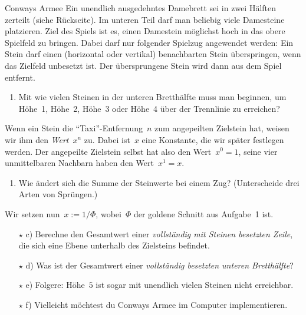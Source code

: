 \documentclass{zirkelblatt}
\begin{document}
\begin{aufgabe}{Conways Armee}
Ein unendlich ausgedehntes Damebrett sei in zwei Hälften zerteilt (siehe
Rückseite). Im unteren Teil darf man beliebig viele Damesteine platzieren. Ziel
des Spiels ist es, einen Damestein möglichst hoch in das obere Spielfeld zu
bringen. Dabei darf nur folgender Spielzug angewendet werden: Ein Stein
darf einen (horizontal oder vertikal) benachbarten Stein überspringen, wenn das
Zielfeld unbesetzt ist. Der übersprungene Stein wird dann aus dem Spiel
entfernt.
\begin{enumerate}
\item Mit wie vielen Steinen in der unteren Bretthälfte muss man beginnen, um
Höhe~1, Höhe~2, Höhe~3 oder Höhe~4 über der Trennlinie zu erreichen?
\end{enumerate}
Wenn ein Stein die
"`Taxi"'-Entfernung~$n$ zum angepeilten Zielstein hat, weisen wir ihm den \emph{Wert}~$x^n$ zu.
Dabei ist~$x$ eine Konstante, die wir später festlegen werden.
Der angepeilte Zielstein selbst hat also den Wert~$x^0 = 1$, seine vier
unmittelbaren Nachbarn haben den Wert~$x^1 = x$.
\begin{enumerate}
\addtocounter{enumi}{1}
\item Wie ändert sich die Summe der Steinwerte bei einem Zug? (Unterscheide drei Arten von Sprüngen.)
\end{enumerate}
Wir setzen nun~$x := 1/\Phi$, wobei~$\Phi$ der goldene Schnitt aus Aufgabe~1
ist.
\begin{enumerate}
\item[$\star$ c)] Berechne den Gesamtwert einer \emph{vollständig mit
Steinen besetzten Zeile}, die sich eine Ebene unterhalb des Zielsteins befindet.
\item[$\star$ d)] Was ist der Gesamtwert einer \emph{vollständig besetzten unteren Bretthälfte}?
\item[$\star$ e)] Folgere: Höhe~$5$ ist sogar mit unendlich vielen Steinen
nicht erreichbar.
\item[$\star$ f)] Vielleicht möchtest du Conways Armee im Computer implementieren.
\end{enumerate}
\end{aufgabe}

\newpage

\newcommand*{\xMin}{0}%
\newcommand*{\xMax}{6}%
\newcommand*{\yMin}{0}%
\newcommand*{\yMax}{6}%
\hspace*{-1.8cm}%
\end{document}
